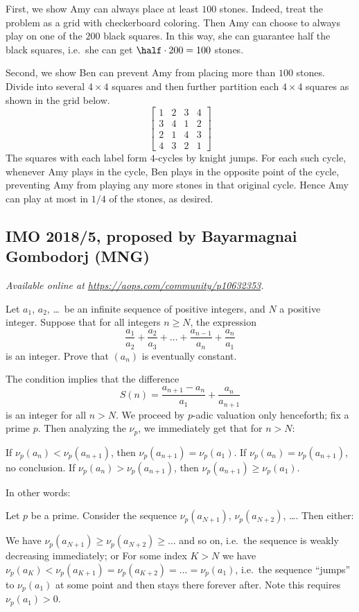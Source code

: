 \documentclass[11pt]{scrartcl}
\begin{document}
First, we show Amy can always place at least $100$ stones.
Indeed, treat the problem as a grid with checkerboard coloring.
Then Amy can choose to always play on one of the $200$ black squares.
In this way, she can guarantee half the black squares,
i.e.\ she can get $\half \cdot 200 = 100$ stones.

Second, we show Ben can prevent Amy from placing more than $100$ stones.
Divide into several $4 \times 4$ squares and then further partition
each $4 \times 4$ squares as shown in the grid below.
\[
  \left[
  \begin{array}{cccc}
    1 & 2 & 3 & 4 \\
    3 & 4 & 1 & 2 \\
    2 & 1 & 4 & 3 \\
    4 & 3 & 2 & 1
  \end{array}
  \right]
\]
The squares with each label form $4$-cycles by knight jumps.
For each such cycle, whenever Amy plays in the cycle,
Ben plays in the opposite point of the cycle,
preventing Amy from playing any more stones in that original cycle.
Hence Amy can play at most in $1/4$ of the stones, as desired.
\pagebreak

\subsection{IMO 2018/5, proposed by Bayarmagnai Gombodorj (MNG)}
\textsl{Available online at \url{https://aops.com/community/p10632353}.}
\begin{mdframed}[style=mdpurplebox,frametitle={Problem statement}]
Let $a_1$, $a_2$, \dots\ be an infinite sequence of positive integers,
and $N$ a positive integer.
Suppose that for all integers $n \ge N$, the expression
\[ \frac{a_1}{a_2} + \frac{a_2}{a_3} + \dots
  + \frac{a_{n-1}}{a_n} + \frac{a_n}{a_1} \]
is an integer.
Prove that $(a_n)$ is eventually constant.
\end{mdframed}
The condition implies that the difference
\[ S(n) = \frac{a_{n+1} - a_n}{a_1} + \frac{a_n}{a_{n+1}} \]
is an integer for all $n > N$.
We proceed by $p$-adic valuation only henceforth;
fix a prime $p$.
Then analyzing the $\nu_p$, we immediately get that for $n > N$:
\begin{itemize}
\ii If $\nu_p(a_n) < \nu_p(a_{n+1})$, then $\nu_p(a_{n+1}) = \nu_p(a_1)$.
\ii If $\nu_p(a_n) = \nu_p(a_{n+1})$, no conclusion.
\ii If $\nu_p(a_n) > \nu_p(a_{n+1})$,
then $\nu_p(a_{n+1}) \ge \nu_p(a_1)$.
\end{itemize}
In other words:
\begin{claim*}
Let $p$ be a prime.  Consider the sequence
$\nu_p(a_{N+1})$, $\nu_p(a_{N+2})$, \dots.
Then either:
\begin{itemize}
  \ii We have $\nu_p(a_{N+1}) \ge \nu_p(a_{N+2}) \ge \dots$
  and so on, i.e.\ the sequence is weakly decreasing immediately; or
  \ii For some index $K > N$ we have
  $\nu_p(a_K) < \nu_p(a_{K+1}) = \nu_p(a_{K+2}) = \dots = \nu_p(a_1)$,
  i.e.\ the sequence ``jumps'' to $\nu_p(a_1)$
  at some point and then stays there forever after.
  Note this requires $\nu_p(a_1) > 0$.
\end{itemize}
\end{claim*}
\end{document}

